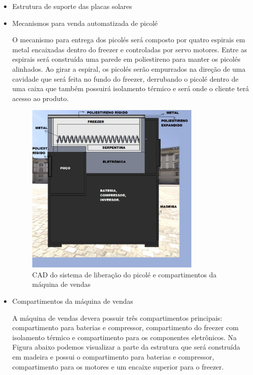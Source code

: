  \begin{itemize}
\item Estrutura de suporte das placas solares

\item Mecanismos para venda automatizada de picolé

O mecanismo para entrega dos picolés será composto por quatro espirais em metal encaixadas dentro do freezer e controladas por servo motores. Entre as espirais será construída uma parede em poliestireno para manter os picolés alinhados. Ao girar a espiral, os picolés serão empurrados na direção de uma cavidade que será feita no fundo do freezer, derrubando o picolé dentro de uma caixa que também possuirá isolamento térmico e será onde o cliente terá acesso ao produto. 

   \begin{figure}[H]
	\centering
    \includegraphics[width=0.8\textwidth]{figuras/cad_vista_lateral}
    \caption{CAD do sistema de liberação do picolé e compartimentos da máquina de vendas}
    \label{fig:cad_vista_lateral}
\end{figure}

\item Compartimentos da máquina de vendas

A máquina de vendas devera possuir três compartimentos principais: compartimento para baterias e compressor, compartimento do freezer com isolamento térmico e compartimento para os componentes eletrônicos. Na Figura abaixo podemos visualizar a parte da estrutura que será construída em madeira e possui o compartimento para baterias e compressor, compartimento para os motores e um encaixe superior para o freezer. 


\end{itemize}
